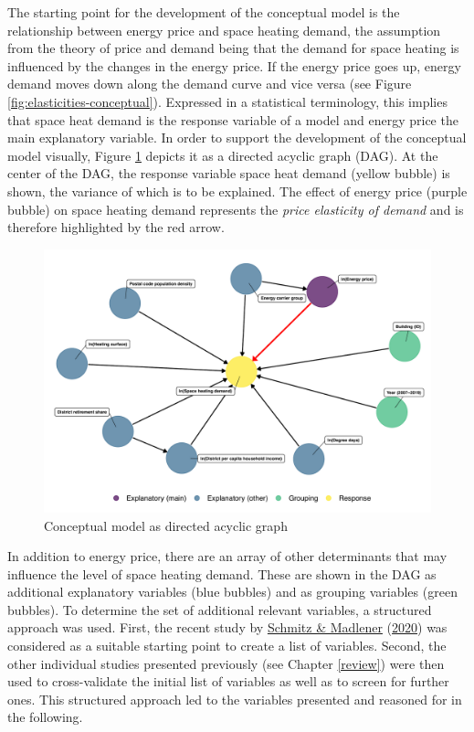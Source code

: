 \documentclass[12pt,twoside]{reedthesis}
\begin{document}
The starting point for the development of the conceptual model is the relationship between energy price and space heating demand, the assumption from the theory of price and demand being that the demand for space heating is influenced by the changes in the energy price. If the energy price goes up, energy demand moves down along the demand curve and vice versa (see Figure \ref{fig:elasticities-conceptual}). Expressed in a statistical terminology, this implies that space heat demand is the response variable of a model and energy price the main explanatory variable. In order to support the development of the conceptual model visually, Figure \ref{fig:dag} depicts it as a directed acyclic graph (DAG). At the center of the DAG, the response variable space heat demand (yellow bubble) is shown, the variance of which is to be explained. The effect of energy price (purple bubble) on space heating demand represents the \emph{price elasticity of demand} and is therefore highlighted by the red arrow.
\begin{figure}

{\centering \includegraphics[width=1\linewidth]{figure/dag_red} 

}

\caption[Conceptual model as directed acyclic graph]{Conceptual model as directed acyclic graph}\label{fig:dag}
\end{figure}
In addition to energy price, there are an array of other determinants that may influence the level of space heating demand. These are shown in the DAG as additional explanatory variables (blue bubbles) and as grouping variables (green bubbles). To determine the set of additional relevant variables, a structured approach was used. First, the recent study by \protect\hyperlink{ref-schmitz_madlener20}{Schmitz \& Madlener} (\protect\hyperlink{ref-schmitz_madlener20}{2020}) was considered as a suitable starting point to create a list of variables. Second, the other individual studies presented previously (see Chapter \ref{review}) were then used to cross-validate the initial list of variables as well as to screen for further ones. This structured approach led to the variables presented and reasoned for in the following.
\end{document}
